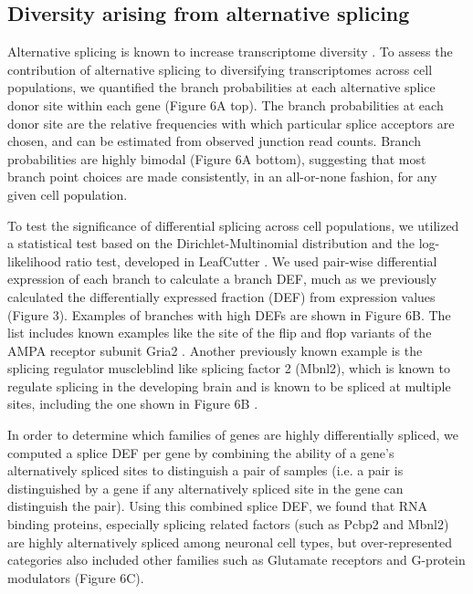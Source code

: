 \subsection{Diversity arising from alternative splicing}

Alternative splicing is known to increase transcriptome diversity \citep{ Andreadis_1987}. To assess the contribution of alternative splicing to diversifying transcriptomes across cell populations, we quantified the branch probabilities at each alternative splice donor site within each gene (Figure 6A top). The branch probabilities at each donor site are the relative frequencies with which particular splice acceptors are chosen, and can be estimated from observed junction read counts. Branch probabilities are highly bimodal (Figure 6A bottom), suggesting that most branch point choices are made consistently, in an all-or-none fashion, for any given cell population.

To test the significance of differential splicing across cell populations, we utilized a statistical test based on the Dirichlet-Multinomial distribution and the log-likelihood ratio test, developed in LeafCutter \citep{Li_2016}. We used pair-wise differential expression of each branch to calculate a branch DEF, much as we previously calculated the differentially expressed fraction (DEF) from expression values (Figure 3). Examples of branches with high DEFs are shown in Figure 6B. The list includes known examples like the site of the flip and flop variants of the AMPA receptor subunit Gria2 \cite{Sommer_1990}. Another previously known example is the splicing regulator muscleblind like splicing factor 2 (Mbnl2), which is known to regulate splicing in the developing brain  \cite{Charizanis_2012} and is known to be spliced at multiple sites, including the one shown in Figure 6B \cite{Pascual_2006}. 

In order to determine which families of genes are highly differentially spliced, we computed a splice DEF per gene by combining the ability of a gene’s alternatively spliced sites to distinguish a pair of samples (i.e. a pair is distinguished by a gene if any alternatively spliced site in the gene can distinguish the pair). Using this combined splice DEF, we found that RNA binding proteins, especially splicing related factors (such as Pcbp2 and Mbnl2) are highly alternatively spliced among neuronal cell types, but over-represented categories also included other families such as Glutamate receptors and G-protein modulators (Figure 6C). 

